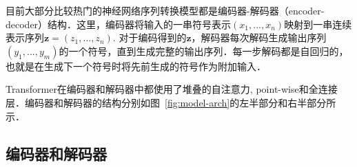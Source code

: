 
目前大部分比较热门的神经网络序列转换模型都是编码器-解码器（encoder-decoder）结构\citep{cho2014learning,bahdanau2014neural,sutskever14}．这里，编码器将输入的一串符号表示$(x_1, ..., x_n)$映射到一串连续表示序列$\mathbf{z} = (z_1, ..., z_n)$. 对于编码得到的$\mathbf{z}$，解码器每次解码生成输出序列$(y_1,...,y_m)$的一个符号，直到生成完整的输出序列．每一步解码都是自回归的\citep{graves2013generating}，也就是在生成下一个符号时将先前生成的符号作为附加输入．


Transformer在编码器和解码器中都使用了堆叠的自注意力, point-wise和全连接层．编码器和解码器的结构分别如图~\ref{fig:model-arch}的左半部分和右半部分所示．

\subsection{编码器和解码器}


